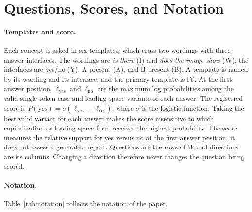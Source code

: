 \documentclass[11pt]{article}
\begin{document}
\section{Questions, Scores, and Notation}
\label{app:protocol}

\paragraph{Templates and score.} Each concept is asked in six templates, which cross two wordings with three answer interfaces. The wordings are \emph{is there} (I) and \emph{does the image show} (W); the interfaces are yes/no (Y), A-present (A), and B-present (B). A template is named by its wording and its interface, and the primary template is IY. At the first answer position, $\ell_{\mathrm{yes}}$ and $\ell_{\mathrm{no}}$ are the maximum log probabilities among the valid single-token case and leading-space variants of each answer. The registered score is $P(\mathrm{yes})=\sigma(\ell_{\mathrm{yes}}-\ell_{\mathrm{no}})$, where $\sigma$ is the logistic function. Taking the best valid variant for each answer makes the score insensitive to which capitalization or leading-space form receives the highest probability. The score measures the relative support for yes versus no at the first answer position; it does not assess a generated report. Questions are the rows of $W$ and directions are its columns. Changing a direction therefore never changes the question being scored.

\paragraph{Notation.} Table~\ref{tab:notation} collects the notation of the paper.
\end{document}
